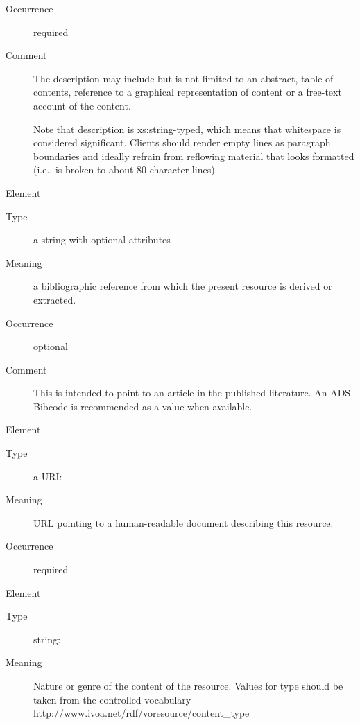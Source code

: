 \documentclass[11pt,a4paper]{ivoa}
\begin{document}
\begin{generated}
\begin{bigdescription}
\begin{description}
\item[Occurrence] required
\item[Comment] 
               The description may include but is not limited to an abstract, 
               table of contents, reference to a graphical representation of
               content or a free-text account of the content.

               Note that description is xs:string-typed, which means that
               whitespace is considered significant.  Clients should
               render empty lines as paragraph boundaries and ideally
               refrain from reflowing material that looks formatted (i.e.,
               is broken to about 80-character lines).
             

\end{description}
\item[Element \xmlel{source}]
\begin{description}
\item[Type] a string with optional attributes
\item[Meaning] 
                a bibliographic reference from which the present resource is 
                derived or extracted.  
             
\item[Occurrence] optional
\item[Comment] 
                This is intended to point to an article in the published 
                literature.  An ADS Bibcode is recommended as a value when 
                available.    
             

\end{description}
\item[Element \xmlel{referenceURL}]
\begin{description}
\item[Type] a URI: 
\item[Meaning] 
                URL pointing to a human-readable document describing this 
                resource.   
             
\item[Occurrence] required

\end{description}
\item[Element \xmlel{type}]
\begin{description}
\item[Type] string: 
\item[Meaning] 
               Nature or genre of the content of the resource.  Values for
               type should be taken from the controlled vocabulary
               http://www.ivoa.net/rdf/voresource/content\_type
             

\end{description}
\end{bigdescription}
\end{generated}
\end{document}
